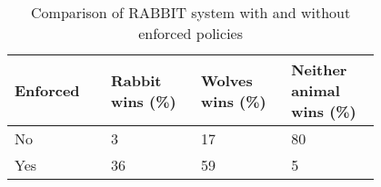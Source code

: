 \begin{table}[h]
	\centering
	\caption{Comparison of RABBIT system with and without enforced policies}
	\label{table:rabbitres}
	\begin{tabular}{|p{0.2\linewidth}|p{0.2\linewidth}|p{0.2\linewidth}|p{0.2\linewidth}|}
		\hline Enforced & Rabbit wins (\%) &  Wolves wins (\%) & Neither animal wins (\%) \\ \hline
		No & 3 & 17 & 80 \\
		Yes & 36 & 59 & 5 \\ \hline       
	\end{tabular}
\end{table}
